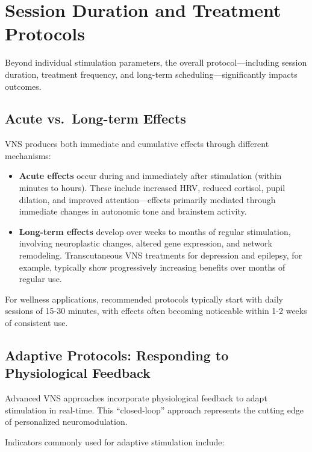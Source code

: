 \documentclass[
  Letterpaper,
]{scrbook}
\begin{document}
\section{Session Duration and Treatment
Protocols}\label{session-duration-and-treatment-protocols}

Beyond individual stimulation parameters, the overall
protocol---including session duration, treatment frequency, and
long-term scheduling---significantly impacts outcomes.

\subsection{Acute vs.~Long-term
Effects}\label{acute-vs.-long-term-effects}

VNS produces both immediate and cumulative effects through different
mechanisms:

\begin{itemize}
\item
  \textbf{Acute effects} occur during and immediately after stimulation
  (within minutes to hours). These include increased HRV, reduced
  cortisol, pupil dilation, and improved attention---effects primarily
  mediated through immediate changes in autonomic tone and brainstem
  activity.
\item
  \textbf{Long-term effects} develop over weeks to months of regular
  stimulation, involving neuroplastic changes, altered gene expression,
  and network remodeling. Transcutaneous VNS treatments for depression
  and epilepsy, for example, typically show progressively increasing
  benefits over months of regular use.
\end{itemize}

For wellness applications, recommended protocols typically start with
daily sessions of 15-30 minutes, with effects often becoming noticeable
within 1-2 weeks of consistent use.

\subsection{Adaptive Protocols: Responding to Physiological
Feedback}\label{adaptive-protocols-responding-to-physiological-feedback}

Advanced VNS approaches incorporate physiological feedback to adapt
stimulation in real-time. This ``closed-loop'' approach represents the
cutting edge of personalized neuromodulation.

Indicators commonly used for adaptive stimulation include:
\end{document}
